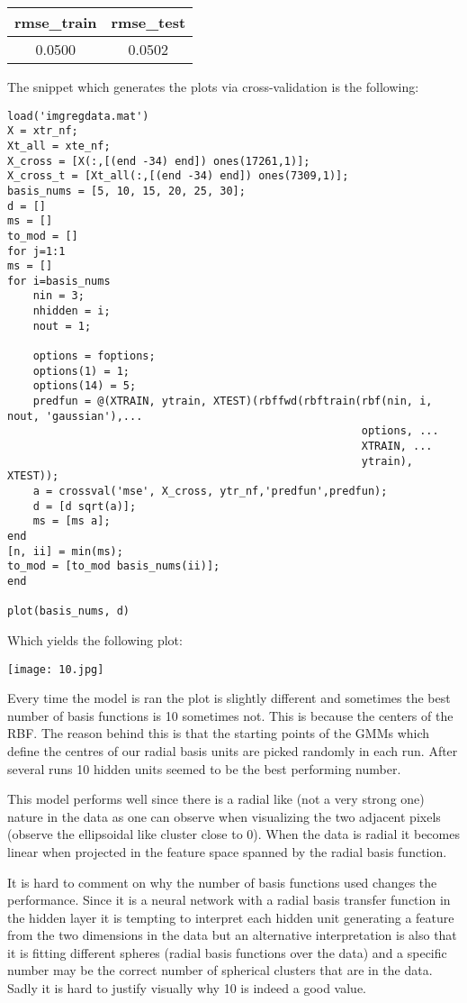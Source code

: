\documentclass[11pt]{article}
\begin{document}
\begin{center}
\begin{tabular}{|c|c|}
\hline
 rmse\_train & rmse\_test \\
 \hline
0.0500 & 0.0502 \\
\hline
\end{tabular}
\end{center}
The snippet which generates the plots via cross-validation is the following: 
\begin{lstlisting}
load('imgregdata.mat')
X = xtr_nf;
Xt_all = xte_nf;
X_cross = [X(:,[(end -34) end]) ones(17261,1)];
X_cross_t = [Xt_all(:,[(end -34) end]) ones(7309,1)];
basis_nums = [5, 10, 15, 20, 25, 30];
d = []
ms = []
to_mod = []
for j=1:1
ms = []
for i=basis_nums
    nin = 3;
    nhidden = i;
    nout = 1;

    options = foptions;
    options(1) = 1;
    options(14) = 5;
    predfun = @(XTRAIN, ytrain, XTEST)(rbffwd(rbftrain(rbf(nin, i, nout, 'gaussian'),...
                                                       options, ...
                                                       XTRAIN, ...
                                                       ytrain), XTEST));
    a = crossval('mse', X_cross, ytr_nf,'predfun',predfun);
    d = [d sqrt(a)];
    ms = [ms a];
end
[n, ii] = min(ms);
to_mod = [to_mod basis_nums(ii)];
end

plot(basis_nums, d)
\end{lstlisting}

Which yields the following plot:

\texttt{[image: 10.jpg]}

Every time the model is ran the plot is slightly different and sometimes the best number of basis functions is 10 sometimes not.
This is because the centers of the RBF.  The reason behind this is that the starting points of the GMMs which define the centres of our radial basis units are picked randomly in each run. After several runs 10 hidden units seemed to be the best performing number. 


This model performs well since there is a radial like (not a very strong one) nature in the data as one can observe when visualizing the two adjacent pixels (observe the ellipsoidal like cluster close to 0). When the data is radial it becomes linear when projected in the feature space spanned by the radial basis function.

It is hard to comment on why the number of basis functions used changes the performance. Since it is a neural network with a radial basis transfer function in the hidden layer it is tempting to interpret each hidden unit generating a feature from the two dimensions in the data but an alternative interpretation is also that it is fitting different spheres (radial basis functions over the data) and a specific number may be the correct number of spherical clusters that are in the data. Sadly it is hard to justify visually why 10 is indeed a good value. 
\end{document}
